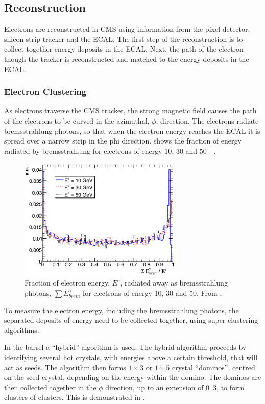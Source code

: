 \subsection{Reconstruction}
Electrons are reconstructed in CMS using information from the pixel detector,
silicon strip tracker and the ECAL.
The first step of the reconstruction is to collect together energy deposits in
the ECAL. Next, the path of the electron though the tracker is reconstructed and
matched to the energy deposits in the ECAL.

\subsubsection{Electron Clustering}
As electrons traverse the CMS tracker, the strong magnetic field causes the path
of the electrons to be curved in the azimuthal, $\phi$, direction. The electrons
radiate bremsstrahlung photons, so that when the electron energy reaches the
ECAL it is spread over a narrow strip in the phi direction.
 shows the fraction of energy radiated by bremsstrahlung for
electrons of energy $10$, $30$ and \unit{$50$}{\GeV} \cite{eReco}.

\begin{figure}[htbp]
  \centering
  \includegraphics[width=0.7\textwidth]{brem}
  \caption{Fraction of electron energy, $E^{e}$, radiated away as bremsstrahlung
photons, $\sum E_{brem}^{\gamma}$ for electrons of energy 10, 30 and
\unit{50}{\GeV}. From \cite{eReco}.}
\label{fig:brem}
\end{figure}

To measure the electron energy, including the bremsstrahlung photons, the
separated deposits of energy need to be collected together, using super-clustering
algorithms. 

In the barrel a ``hybrid'' algorithm is used. The hybrid algorithm proceeds by
identifying several hot crystals, with energies above a certain threshold, that
will act as seeds. The algorithm then forms $1\times3$ or $1\times5$ crystal
``dominos'', centred on the seed crystal, depending on the energy within the
domino. The dominos are then collected together in the $\phi$ direction, up to
an extension of \unit{0.3}{\rad}, to form clusters of clusters. This is
demonstrated in  \cite{eECAL}.

